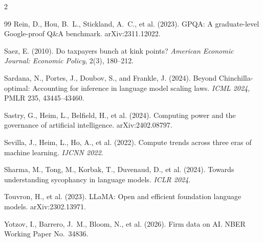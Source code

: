 \documentclass[11pt]{article}
\begin{document}
\begin{multicols}{2}
\begin{thebibliography}{99}
Rein, D., Hou, B.~L., Stickland, A.~C., et al. (2023).
GPQA: A graduate-level Google-proof Q\&A benchmark.
arXiv:2311.12022.

Saez, E. (2010).
Do taxpayers bunch at kink points?
\emph{American Economic Journal: Economic Policy}, 2(3), 180--212.

Sardana, N., Portes, J., Doubov, S., and Frankle, J. (2024).
Beyond Chinchilla-optimal: Accounting for inference in language model
scaling laws.
\emph{ICML 2024}, PMLR 235, 43445--43460.

Sastry, G., Heim, L., Belfield, H., et al. (2024).
Computing power and the governance of artificial intelligence.
arXiv:2402.08797.

Sevilla, J., Heim, L., Ho, A., et al. (2022).
Compute trends across three eras of machine learning.
\emph{IJCNN 2022}.

Sharma, M., Tong, M., Korbak, T., Duvenaud, D., et al. (2024).
Towards understanding sycophancy in language models.
\emph{ICLR 2024}.

Touvron, H., et al. (2023).
LLaMA: Open and efficient foundation language models. arXiv:2302.13971.

Yotzov, I., Barrero, J.~M., Bloom, N., et al. (2026).
Firm data on AI.
NBER Working Paper No.~34836.

\end{thebibliography}
\end{multicols}
\end{document}
